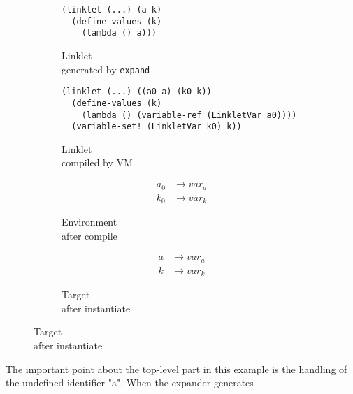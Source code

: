 \begin{figure}[h!]
  \footnotesize
  \begin{subfigure}[b]{0.25\textwidth}
    \begin{mdframed}
\begin{verbatim}
(linklet (...) (a k)
  (define-values (k)
    (lambda () a)))
\end{verbatim}
    \end{mdframed}
    \caption{Linklet \\ generated by \texttt{expand}}
    \label{fig:1}
  \end{subfigure}
  \begin{subfigure}[b]{0.4\textwidth}
    \begin{mdframed}
\begin{verbatim}
(linklet (...) ((a0 a) (k0 k))
  (define-values (k)
    (lambda () (variable-ref (LinkletVar a0))))
  (variable-set! (LinkletVar k0) k))
\end{verbatim}
    \end{mdframed}
    \caption{Linklet \\ compiled by VM}
    \label{fig:2}
  \end{subfigure} \hfill
  \begin{subfigure}[b]{0.15\textwidth}
    \begin{mdframed}
      \begin{align*}
        a_0 &\rightarrow var_a \\
        k_0 &\rightarrow var_k
      \end{align*}
    \end{mdframed}
    \caption{Environment \\ after compile}
    \label{fig:2}
  \end{subfigure}
  \begin{subfigure}[b]{0.15\textwidth}
    \begin{mdframed}
      \begin{align*}
        a &\rightarrow var_a \\
        k &\rightarrow var_k
      \end{align*}
    \end{mdframed}
    \caption{Target \\ after instantiate}
    \label{fig:2}
  \end{subfigure}
\end{figure}
\vspace{-0.25cm}
The important point about the top-level part in this example is the
handling of the undefined identifier "a". When the expander generates
